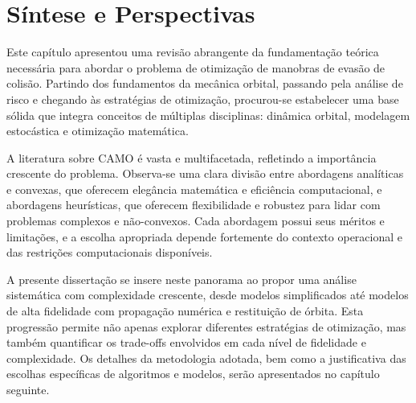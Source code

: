 \section{Síntese e Perspectivas}
\label{sec:sintese}

Este capítulo apresentou uma revisão abrangente da fundamentação teórica necessária para abordar o problema de otimização de manobras de evasão de colisão. Partindo dos fundamentos da mecânica orbital, passando pela análise de risco e chegando às estratégias de otimização, procurou-se estabelecer uma base sólida que integra conceitos de múltiplas disciplinas: dinâmica orbital, modelagem estocástica e otimização matemática.

A literatura sobre CAMO é vasta e multifacetada, refletindo a importância crescente do problema. Observa-se uma clara divisão entre abordagens analíticas e convexas, que oferecem elegância matemática e eficiência computacional, e abordagens heurísticas, que oferecem flexibilidade e robustez para lidar com problemas complexos e não-convexos. Cada abordagem possui seus méritos e limitações, e a escolha apropriada depende fortemente do contexto operacional e das restrições computacionais disponíveis.

A presente dissertação se insere neste panorama ao propor uma análise sistemática com complexidade crescente, desde modelos simplificados até modelos de alta fidelidade com propagação numérica e restituição de órbita. Esta progressão permite não apenas explorar diferentes estratégias de otimização, mas também quantificar os trade-offs envolvidos em cada nível de fidelidade e complexidade. Os detalhes da metodologia adotada, bem como a justificativa das escolhas específicas de algoritmos e modelos, serão apresentados no capítulo seguinte.
